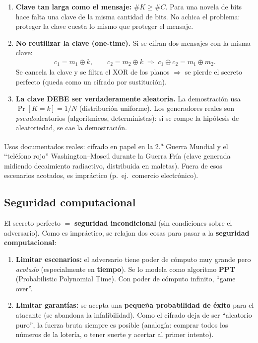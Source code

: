 \documentclass[../main.tex]{subfiles}
\begin{document}
\begin{destacado}
\begin{enumerate}[nosep]
  \item \textbf{Clave tan larga como el mensaje:} $\#K \ge \#C$. Para una novela
        de bits hace falta una clave de la misma cantidad de bits. No achica el
        problema: proteger la clave cuesta lo mismo que proteger el mensaje.
  \item \textbf{No reutilizar la clave (one-time).} Si se cifran dos mensajes
        con la misma clave:
        \begin{align*}
        c_1 = m_1 \oplus k,\qquad c_2 = m_2 \oplus k
        \;\Rightarrow\; c_1 \oplus c_2 = m_1 \oplus m_2.
        \end{align*}
        Se cancela la clave y se filtra el XOR de los planos $\Rightarrow$
        se pierde el secreto perfecto (queda como un cifrado por sustitución).
  \item \textbf{La clave DEBE ser verdaderamente aleatoria.} La demostración
        usa $\Pr[K{=}k]=1/N$ (distribución uniforme). Los generadores reales
        son \emph{pseudo}aleatorios (algorítmicos, deterministas): si se rompe
        la hipótesis de aleatoriedad, se cae la demostración.
\end{enumerate}
\end{destacado}


Usos documentados reales: cifrado en papel en la 2.\textsuperscript{a} Guerra
Mundial y el ``teléfono rojo'' Washington--Moscú durante la Guerra Fría (clave
generada midiendo decaimiento radiactivo, distribuida en maletas). Fuera de
esos escenarios acotados, es impráctico (p.\ ej.\ comercio electrónico).

\subsection{Seguridad computacional}

El secreto perfecto $=$ \textbf{seguridad incondicional} (sin condiciones sobre
el adversario). Como es impráctico, se relajan dos cosas para pasar a la
\textbf{seguridad computacional}:

\begin{enumerate}[nosep]
  \item \textbf{Limitar escenarios:} el adversario tiene poder de cómputo muy
        grande pero \emph{acotado} (especialmente en \textbf{tiempo}). Se lo
        modela como algoritmo \textbf{PPT} (Probabilistic Polynomial Time). Con
        poder de cómputo infinito, ``game over''.
  \item \textbf{Limitar garantías:} se acepta una \textbf{pequeña probabilidad
        de éxito} para el atacante (se abandona la infalibilidad). Como el
        cifrado deja de ser ``aleatorio puro'', la fuerza bruta siempre es
        posible (analogía: comprar todos los números de la lotería, o tener
        suerte y acertar al primer intento).
\end{enumerate}
\end{document}
